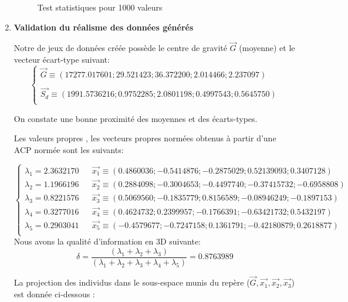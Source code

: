 \documentclass[a4paper]{article}
\begin{document}
\begin{enumerate}
\begin{figure}[H]
\begin{center}
\begin{tabular}{|l|c|r|}
\hline
\end{tabular}
\end{center}
\caption{Test statistiques pour 1000 valeurs }
\end{figure}

\newpage

\item \textbf{Validation du réalisme des données générés}

Notre de jeux de données créée possède le centre de gravité $\vec{G}$ (moyenne) et le vecteur écart-type suivant:
\[
\left\lbrace 
\begin{array}{lcl} 
\vec{G}\equiv(17277.017601;    29.521423;    36.372200;     2.014466;     2.237097)\\ \\
\vec{S_{d}}\equiv (1991.5736216;    0.9752285;    2.0801198;    0.4997543;    0.5645750)\\ 
\end{array}\right.
\]

On constate une bonne proximité des moyennes et des écarts-types.


Les valeurs propres , les vecteurs propres normées obtenus à partir d'une ACP normée  sont les suivants:

\[
\left\lbrace 
\begin{array}{lcl} 
\lambda_{1}=2.3632170 && \vec{x_{1}}\equiv (0.4860036; -0.5414876; -0.2875029;  0.52139093;  0.3407128)\\
\lambda_{2}=1.1966196 && \vec{x_{2}}\equiv( 0.2884098; -0.3004653; -0.4497740; -0.37415732; -0.6958808)\\
\lambda_{3}=0.8221576 && \vec{x_{3}}\equiv ( 0.5069560; -0.1835779;  0.8156589; -0.08946249; -0.1897153)\\
\lambda_{4}=0.3277016 &&\vec{x_{4}}\equiv (0.4624732;  0.2399957; -0.1766391; -0.63421732;  0.5432197)\\
\lambda_{5}=0.2903041 &&\vec{x_{5}}\equiv ( -0.4579677; -0.7247158;  0.1361791; -0.42180879;  0.2618877)\\
\end{array}\right.
\]
Nous avons la qualité d'information en 3D suivante:
$$\delta=\frac{(\lambda_{1}+\lambda_{2}+\lambda_{3})}{(\lambda_{1}+\lambda_{2}+\lambda_{3}+\lambda_{4}+\lambda_{5})}=0.8763989$$

La projection des individus dans le sous-espace munis du repère ($\vec{G},\vec{x_{1}},\vec{x_{2}},\vec{x_{3}}$) est donnée ci-dessous :



\end{enumerate}
\end{document}
